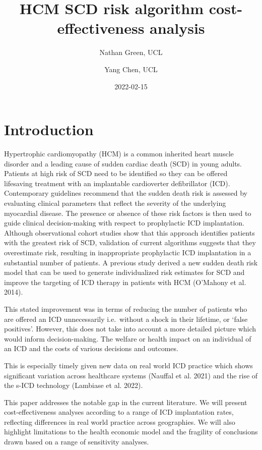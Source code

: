 \documentclass[
]{article}
\title{HCM SCD risk algorithm cost-effectiveness analysis}
\author{Nathan Green, UCL \and Yang Chen, UCL}
\date{2022-02-15}
\begin{document}
\maketitle

\hypertarget{introduction}{%
\section{Introduction}\label{introduction}}

Hypertrophic cardiomyopathy (HCM) is a common inherited heart muscle
disorder and a leading cause of sudden cardiac death (SCD) in young
adults. Patients at high risk of SCD need to be identified so they can
be offered lifesaving treatment with an implantable cardioverter
defibrillator (ICD). Contemporary guidelines recommend that the sudden
death risk is assessed by evaluating clinical parameters that reflect
the severity of the underlying myocardial disease. The presence or
absence of these risk factors is then used to guide clinical
decision-making with respect to prophylactic ICD implantation. Although
observational cohort studies show that this approach identifies patients
with the greatest risk of SCD, validation of current algorithms suggests
that they overestimate risk, resulting in inappropriate prophylactic ICD
implantation in a substantial number of patients. A previous study
derived a new sudden death risk model that can be used to generate
individualized risk estimates for SCD and improve the targeting of ICD
therapy in patients with HCM (O'Mahony et al. 2014).

This stated improvement was in terms of reducing the number of patients
who are offered an ICD unnecessarily i.e.~without a shock in their
lifetime, or `false positives'. However, this does not take into account
a more detailed picture which would inform decision-making. The welfare
or health impact on an individual of an ICD and the costs of various
decisions and outcomes.

This is especially timely given new data on real world ICD practice
which shows significant variation across healthcare systems (Nauffal et
al. 2021) and the rise of the s-ICD technology (Lambiase et al. 2022).

This paper addresses the notable gap in the current literature. We will
present cost-effectiveness analyses according to a range of ICD
implantation rates, reflecting differences in real world practice across
geographies. We will also highlight limitations to the health economic
model and the fragility of conclusions drawn based on a range of
sensitivity analyses.
\end{document}
